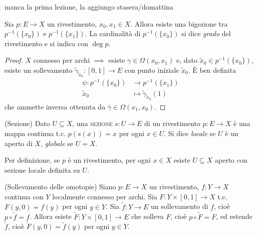 manca la prima lezione, la aggiungo stasera/domattina

\begin{prop}
  Sia $p:E \rightarrow X$ un rivestimento, $x_0, x_1 \in X$. Allora esiste una bigezione tra $p^{-1}(\{x_0\})$ e $p^{-1}(\{x_1\})$. La cardinalità di $p^{-1}(\{x_0\})$ si dice \textit{grado} del rivestimento e si indica con $\deg{p}$.
\end{prop}

\begin{proof}
  $X$ connesso per archi $\implies$ esiste $\gamma \in \Omega(x_0, x_1)$ e, dato $\tilde{x}_0 \in p^{-1}(\{x_0\})$, esiste un sollevamento $\tilde{\gamma}_{\tilde{x}_0}: [0, 1] \rightarrow E$ con punto iniziale $\tilde{x}_0$. È ben definita
  \begin{align*}
  \psi:p^{-1}(\{x_0\}) &\longrightarrow p^{-1}(\{x_1\}) \\
  \tilde{x}_0 &\longmapsto \tilde{\gamma}_{\tilde{x}_0}(1)
  \end{align*}
  che ammette inversa ottenuta da $\bar{\gamma} \in \Omega(x_1, x_0)$.
\end{proof}

\begin{defn}
  (Sezione) Dato $U \subseteq X$, una \textsc{sezione} $s:U \rightarrow E$ di un rivestimento $p:E \rightarrow X$ è una mappa continua t.c. $p(s(x))=x$ per ogni $x \in U$. Si dice \textit{locale} se $U$ è un aperto di $X$, \textit{globale} se $U=X$.
\end{defn}

\begin{oss}
  Per definizione, se $p$ è un rivestimento, per ogni $x \in X$ esiste $U \subseteq X$ aperto con sezione locale definita su $U$.
\end{oss}

\begin{thm}
  (Sollevamento delle omotopie) Siano $p:E \rightarrow X$ un rivestimento, $f:Y \rightarrow X$ continua con $Y$ localmente connesso per archi. Sia $F:Y \times[0, 1] \rightarrow X$ t.c. $F(y, 0)=f(y)$ per ogni $y \in Y$. Sia $\tilde{f}:Y \rightarrow E$ un sollevamento di $f$, cioè $p \circ \tilde{f}=f$.
  Allora esiste $\tilde{F}:Y \times [0, 1] \rightarrow E$ che solleva $F$, cioè $p \circ \tilde{F}=F$, ed estende $\tilde{f}$, cioè $\tilde{F}(y, 0)=\tilde{f}(y)$ per ogni $y \in Y$.
\end{thm}

